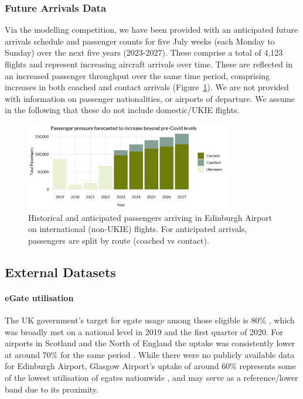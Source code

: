 \documentclass[10pt]{article}
\begin{document}
\subsubsection{Future Arrivals Data} \label{sec:future_arrivals_data}
Via the modelling competition, we have been provided with an anticipated future arrivals schedule and passenger counts for five July weeks (each Monday to Sunday) over the next five years (2023-2027). These comprise a total of 4,123 flights and represent increasing aircraft arrivals over time. These are reflected in an increased passenger throughput over the same time period, comprising increases in both coached and contact arrivals (Figure~\ref{fig:future_passenger_burden}). We are not provided with information on passenger nationalities, or airports of departure. We assume in the following that these do not include domestic/UKIE flights. 

% 


\begin{figure}[!ht]
    \centering
    \includegraphics[width=0.8\textwidth]{figures/future_passenger_burden_fig.png}
     \caption{
     Historical and anticipated passengers arriving in Edinburgh Airport on international (non-UKIE) flights. For anticipated arrivals, passengers are split by route (coached vs contact).} \label{fig:future_passenger_burden}
\end{figure}

\subsection{External Datasets} \label{sec:observed_arrivals_data}

\paragraph{eGate utilisation}
The UK government's target for \gls{egate} usage among those eligible is 80\% \cite{UK_border_2025}, which was broadly met on a national level in 2019 and the first quarter of 2020. For airports in Scotland and the North of England the uptake was consistently lower at around 70\% for the same period \cite{Inspection_eGates}. While there were no publicly available data for Edinburgh Airport, Glasgow Airport's uptake of around 60\% represents some of the lowest utilisation of \glspl{egate} nationwide \cite{Inspection_eGates}, and may serve as a reference/lower band due to its proximity.
\end{document}
